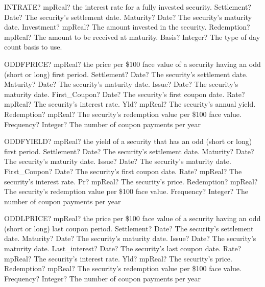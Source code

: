 \documentclass[12pt,a4paper,openany]{book}
\begin{document}
\begin{mpFunctionsExtract}
\mpWorksheetFunctionFiveNotImplemented
{INTRATE? mpReal? the interest rate for a fully invested security.}
{Settlement? Date?  The security's settlement date.}
{Maturity? Date? The security's maturity date.}
{Investment? mpReal?  The amount invested in the security.}
{Redemption? mpReal? The amount to be received at maturity.}
{Basis? Integer? The type of day count basis to use.}
\end{mpFunctionsExtract}

\begin{mpFunctionsExtract}
\mpWorksheetFunctionEightNotImplemented
{ODDFPRICE? mpReal? the price per \$100 face value of a security having an odd (short or long) first period.}
{Settlement? Date?  The security's settlement date.}
{Maturity? Date? The security's maturity date.}
{Issue? Date?  The security's maturity date.}
{First\_Coupon? Date? The security's first coupon date.}
{Rate? mpReal? The security's interest rate.}
{Yld? mpReal? The security's annual yield.}
{Redemption? mpReal? The security's redemption value per \$100 face value.}
{Frequency? Integer? The number of coupon payments per year}
\end{mpFunctionsExtract}

\begin{mpFunctionsExtract}
\mpWorksheetFunctionEightNotImplemented
{ODDFYIELD? mpReal? the yield of a security that has an odd (short or long) first period.}
{Settlement? Date?  The security's settlement date.}
{Maturity? Date? The security's maturity date.}
{Issue? Date?  The security's maturity date.}
{First\_Coupon? Date? The security's first coupon date.}
{Rate? mpReal? The security's interest rate.}
{Pr? mpReal? The security's price.}
{Redemption? mpReal? The security's redemption value per \$100 face value.}
{Frequency? Integer? The number of coupon payments per year}
\end{mpFunctionsExtract}

\begin{mpFunctionsExtract}
\mpWorksheetFunctionEightNotImplemented
{ODDLPRICE? mpReal? the price per \$100 face value of a security having an odd (short or long) last coupon period.}
{Settlement? Date?  The security's settlement date.}
{Maturity? Date? The security's maturity date.}
{Issue? Date?  The security's maturity date.}
{Last\_interest? Date? The security's last coupon date.}
{Rate? mpReal? The security's interest rate.}
{Yld? mpReal? The security's price.}
{Redemption? mpReal? The security's redemption value per \$100 face value.}
{Frequency? Integer? The number of coupon payments per year}
\end{mpFunctionsExtract}
\end{document}
